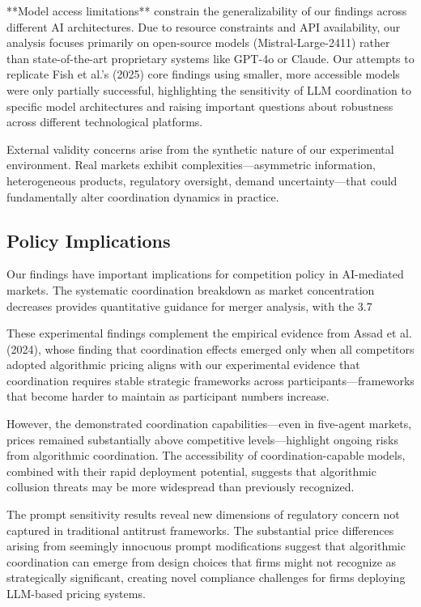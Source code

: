 **Model access limitations** constrain the generalizability of our findings across different AI architectures. Due to resource constraints and API availability, our analysis focuses primarily on open-source models (Mistral-Large-2411) rather than state-of-the-art proprietary systems like GPT-4o or Claude. Our attempts to replicate Fish et al.'s (2025) core findings using smaller, more accessible models were only partially successful, highlighting the sensitivity of LLM coordination to specific model architectures and raising important questions about robustness across different technological platforms.

External validity concerns arise from the synthetic nature of our experimental environment. Real markets exhibit complexities—asymmetric information, heterogeneous products, regulatory oversight, demand uncertainty—that could fundamentally alter coordination dynamics in practice.

\subsection{Policy Implications}

Our findings have important implications for competition policy in AI-mediated markets. The systematic coordination breakdown as market concentration decreases provides quantitative guidance for merger analysis, with the 3.7%

These experimental findings complement the empirical evidence from Assad et al. (2024), whose finding that coordination effects emerged only when all competitors adopted algorithmic pricing aligns with our experimental evidence that coordination requires stable strategic frameworks across participants—frameworks that become harder to maintain as participant numbers increase.

However, the demonstrated coordination capabilities—even in five-agent markets, prices remained substantially above competitive levels—highlight ongoing risks from algorithmic coordination. The accessibility of coordination-capable models, combined with their rapid deployment potential, suggests that algorithmic collusion threats may be more widespread than previously recognized.

The prompt sensitivity results reveal new dimensions of regulatory concern not captured in traditional antitrust frameworks. The substantial price differences arising from seemingly innocuous prompt modifications suggest that algorithmic coordination can emerge from design choices that firms might not recognize as strategically significant, creating novel compliance challenges for firms deploying LLM-based pricing systems.

